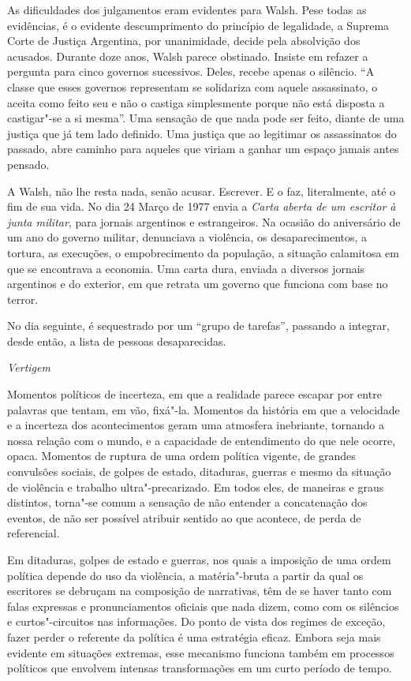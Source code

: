 As dificuldades dos julgamentos eram evidentes para Walsh. Pese todas as
evidências, é o evidente descumprimento do princípio de legalidade, a
Suprema Corte de Justiça Argentina, por unanimidade, decide pela
absolvição dos acusados. Durante doze anos, Walsh parece obstinado.
Insiste em refazer a pergunta para cinco governos sucessivos. Deles,
recebe apenas o silêncio. ``A classe que esses governos representam se
solidariza com aquele assassinato, o aceita como feito seu e não o
castiga simplesmente porque não está disposta a castigar"-se a si
mesma''. Uma sensação de que nada pode ser feito, diante de uma justiça
que já tem lado definido. Uma justiça que ao legitimar os assassinatos
do passado, abre caminho para aqueles que viriam a ganhar um espaço
jamais antes pensado.

A Walsh, não lhe resta nada, senão acusar. Escrever. E o faz,
literalmente, até o fim de sua vida. No dia 24 Março de 1977 envia a
\emph{Carta aberta de um escritor à junta militar}, para jornais
argentinos e estrangeiros. Na ocasião do aniversário de um ano do
governo militar, denunciava a violência, os desaparecimentos, a tortura,
as execuções, o empobrecimento da população, a situação calamitosa em
que se encontrava a economia. Uma carta dura, enviada a diversos jornais
argentinos e do exterior, em que retrata um governo que funciona com
base no terror.

No dia seguinte, é sequestrado por um ``grupo de tarefas'', passando a
integrar, desde então, a lista de pessoas desaparecidas.

\asterisc

\emph{Vertigem}

Momentos políticos de incerteza, em que a realidade parece escapar por
entre palavras que tentam, em vão, fixá"-la. Momentos da história em que
a velocidade e a incerteza dos acontecimentos geram uma atmosfera
inebriante, tornando a nossa relação com o mundo, e a capacidade de
entendimento do que nele ocorre, opaca. Momentos de ruptura de uma ordem
política vigente, de grandes convulsões sociais, de golpes de estado,
ditaduras, guerras e mesmo da situação de violência e trabalho
ultra"-precarizado. Em todos eles, de maneiras e graus distintos,
torna"-se comum a sensação de não entender a concatenação dos eventos, de
não ser possível atribuir sentido ao que acontece, de perda de
referencial.

Em ditaduras, golpes de estado e guerras, nos quais a imposição de uma
ordem política depende do uso da violência, a matéria"-bruta a partir da
qual os escritores se debruçam na composição de narrativas, têm de se
haver tanto com falas expressas e pronunciamentos oficiais que nada
dizem, como com os silêncios e curtos"-circuitos nas informações. Do
ponto de vista dos regimes de exceção, fazer perder o referente da
política é uma estratégia eficaz. Embora seja mais evidente em situações
extremas, esse mecanismo funciona também em processos políticos que
envolvem intensas transformações em um curto período de tempo.

